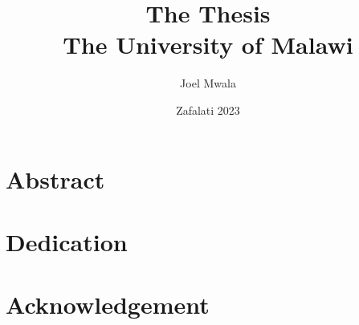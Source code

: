\documentclass[12pt]{report}
\title{The Thesis \\\large{The University of Malawi}}
\author{Joel Mwala}
\date{Zafalati 2023}
\begin{document}
\maketitle

\chapter*{Abstract}
\lipsum[1-3] %
\chapter*{Dedication}
\lipsum[1]
\chapter*{Acknowledgement}
\tableofcontents




\appendix




\end{document}
